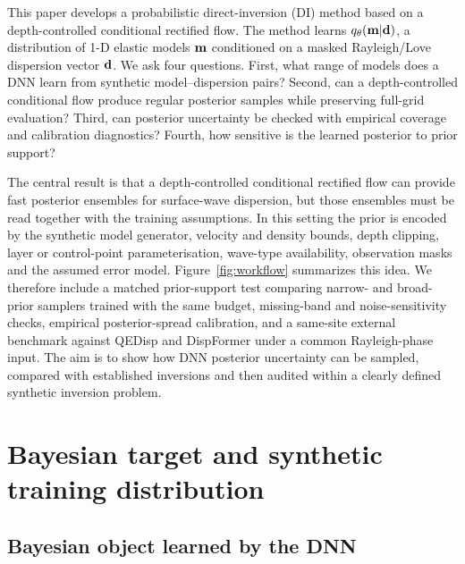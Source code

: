 \documentclass[referee]{gji}
\begin{document}
This paper develops a probabilistic direct-inversion (DI) method based on a depth-controlled conditional rectified flow. The method learns $q_\theta({\bf m}|{\bf d})$, a distribution of 1-D elastic models ${\bf m}$ conditioned on a masked Rayleigh/Love dispersion vector ${\bf d}$. We ask four questions. First, what range of models does a DNN learn from synthetic model--dispersion pairs? Second, can a depth-controlled conditional flow produce regular posterior samples while preserving full-grid evaluation? Third, can posterior uncertainty be checked with empirical coverage and calibration diagnostics? Fourth, how sensitive is the learned posterior to prior support?

The central result is that a depth-controlled conditional rectified flow can provide fast posterior ensembles for surface-wave dispersion, but those ensembles must be read together with the training assumptions. In this setting the prior is encoded by the synthetic model generator, velocity and density bounds, depth clipping, layer or control-point parameterisation, wave-type availability, observation masks and the assumed error model. Figure~\ref{fig:workflow} summarizes this idea. We therefore include a matched prior-support test comparing narrow- and broad-prior samplers trained with the same budget, missing-band and noise-sensitivity checks, empirical posterior-spread calibration, and a same-site external benchmark against QEDisp and DispFormer under a common Rayleigh-phase input. The aim is to show how DNN posterior uncertainty can be sampled, compared with established inversions and then audited within a clearly defined synthetic inversion problem.

\section{Bayesian target and synthetic training distribution}

\subsection{Bayesian object learned by the DNN}
\end{document}
